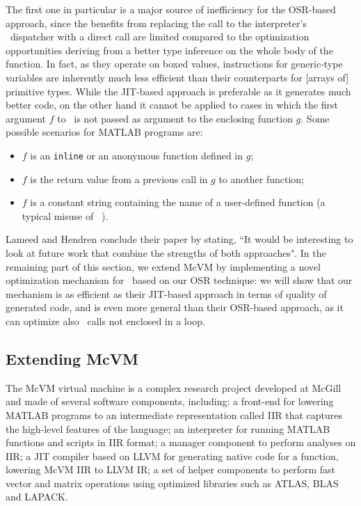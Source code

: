 The first one in particular is a major source of inefficiency for the OSR-based approach, since the benefits from replacing the call to the interpreter's \feval\ dispatcher with a direct call are limited compared to the optimization opportunities deriving from a better type inference on the whole body of the function. In fact, as they operate on boxed values, instructions for generic-type variables are inherently much less efficient than their counterparts for [arrays of] primitive types. While the JIT-based approach is preferable as it generates much better code, on the other hand it cannot be applied to cases in which the first argument $f$ to \feval\ is not passed as argument to the enclosing function $g$. Some possible scenarios for MATLAB programs are:
\begin{itemize}
\item $f$ is an {\tt inline} or an anonymous function defined in $g$;
\item $f$ is the return value from a previous call in $g$ to another function;
\item $f$ is a constant string containing the name of a user-defined function (a typical misuse of \feval ~\cite{radpour2013refactoring}).
\end{itemize}
 
Lameed and Hendren conclude their paper by stating, ``It would be interesting to look at future work that combine the
strengths of both approaches". In the remaining part of this section, we extend McVM by implementing a novel optimization mechanism for \feval\ based on our OSR technique: we will show that our mechanism is as efficient as their JIT-based approach in terms of quality of generated code, and is even more general than their OSR-based approach, as it can optimize also \feval\ calls not enclosed in a loop.
\fi

\subsection{Extending McVM}
The McVM virtual machine is a complex research project developed at McGill~\cite{mcvm} and made of several software components, including: a front-end for lowering MATLAB programs to an intermediate representation called IIR that captures the high-level features of the language; an interpreter for running MATLAB functions and scripts in IIR format; a manager component to perform analyses on IIR; a JIT compiler based on LLVM for generating native code for a function, lowering McVM IIR to LLVM IR; a set of helper components to perform fast vector and matrix operations using optimized libraries such as ATLAS, BLAS and LAPACK. %

